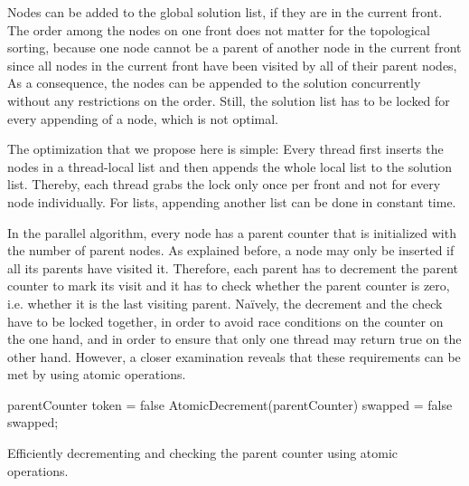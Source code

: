 Nodes can be added to the global solution list, if they are in the current front.
The order among the nodes on one front does not matter for the topological sorting,
because one node cannot be a parent of another node in the current front since all nodes in the current front have been visited by all of their parent nodes, 
As a consequence, the nodes can be appended to the solution concurrently without any restrictions on the order.
Still, the solution list has to be locked for every appending of a node, which is not optimal.

The optimization that we propose here is simple: Every thread first inserts the nodes in a thread-local list and then appends the whole local list to the solution list.
Thereby, each thread grabs the lock only once per front and not for every node individually.
For lists, appending another list can be done in constant time.

In the parallel algorithm, every node has a parent counter that is initialized with the number of parent nodes.
As explained before, a node may only be inserted if all its parents have visited it.
Therefore, each parent has to decrement the parent counter to mark its visit and it has to check whether the parent counter is zero, i.e. whether it is the last visiting parent.
Na{\"i}vely, the decrement and the check have to be locked together, in order to avoid race conditions on the counter on the one hand, and in order to ensure that only one thread may return true on the other hand. 
However, a closer examination reveals that these requirements can be met by using atomic operations.

\begin{listing}
  \KwInt parentCounter\;
  \KwBool token = false\;
   {
    AtomicDecrement(parentCounter)\;
    \KwBool swapped = false\;
    \KwRet swapped;
  }
 \caption{Efficiently decrementing and checking the parent counter using atomic operations.}
 \label{lst:parentCounter}
\end{listing}

